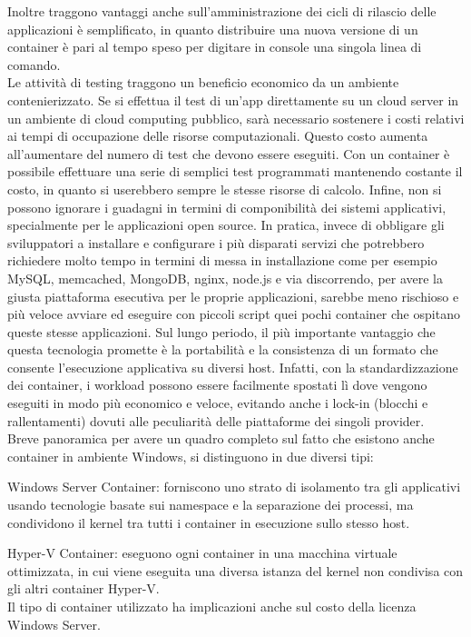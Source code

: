 \documentclass[a4paper,12pt,openright,twoside]{report}
\begin{document}
Inoltre traggono vantaggi anche sull’amministrazione dei cicli di rilascio delle applicazioni è semplificato, in quanto distribuire una nuova versione di un container è pari al tempo speso per digitare in console una singola linea di comando.\\
Le attività di testing traggono un beneficio economico da un ambiente contenierizzato. Se si effettua il test di un’app direttamente su un cloud server in un ambiente di cloud computing pubblico, sarà necessario sostenere i costi relativi ai tempi di occupazione delle risorse computazionali. Questo costo aumenta all’aumentare del numero di test che devono essere eseguiti. Con un container è possibile effettuare una serie di semplici test programmati mantenendo costante il costo, in quanto si userebbero sempre le stesse risorse di calcolo.
Infine, non si possono ignorare i guadagni in termini di componibilità dei sistemi applicativi, specialmente per le applicazioni open source. In pratica, invece di obbligare gli sviluppatori a installare e configurare i più disparati servizi che potrebbero richiedere molto tempo in termini di messa in installazione come per esempio MySQL, memcached, MongoDB, nginx, node.js e via discorrendo, per avere la giusta piattaforma esecutiva per le proprie applicazioni, sarebbe meno rischioso e più veloce avviare ed eseguire con piccoli script quei pochi container che ospitano queste stesse applicazioni.
Sul lungo periodo, il più importante vantaggio che questa tecnologia promette è la portabilità e la consistenza di un formato che consente l’esecuzione applicativa su diversi host. Infatti, con la standardizzazione dei container, i workload possono essere facilmente spostati lì dove vengono eseguiti in modo più economico e veloce, evitando anche i lock-in (blocchi  e rallentamenti) dovuti alle peculiarità delle piattaforme dei singoli provider.\\Breve panoramica per avere un quadro completo sul fatto che esistono anche container in ambiente Windows, si distinguono in due diversi tipi:

Windows Server Container: forniscono uno strato di isolamento tra gli applicativi usando tecnologie basate sui namespace e la separazione dei processi, ma condividono il kernel tra tutti i container in esecuzione sullo stesso host.

Hyper-V Container: eseguono ogni container in una macchina virtuale ottimizzata, in cui viene eseguita una diversa istanza del kernel non condivisa con gli altri container Hyper-V.\\ 
Il tipo di container utilizzato ha implicazioni anche sul costo della licenza Windows Server.
\end{document}
